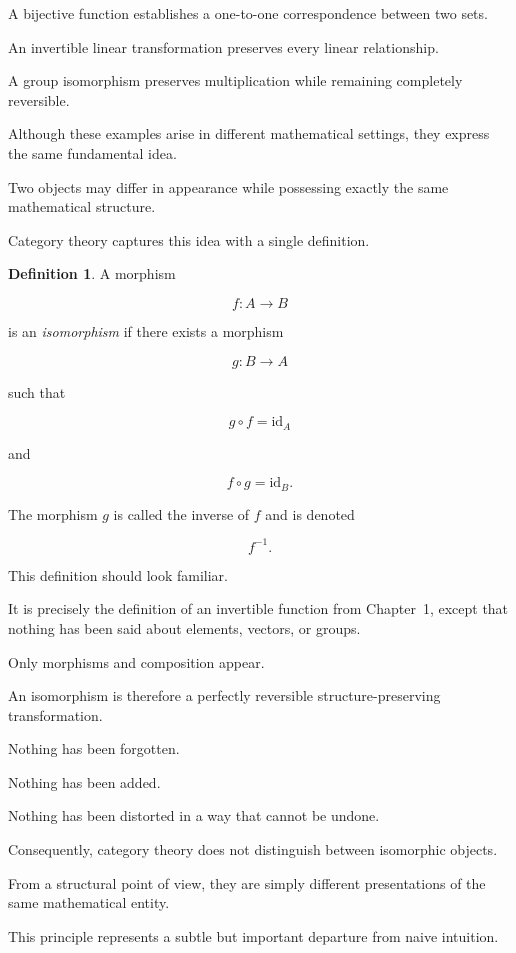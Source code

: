 \documentclass[11pt]{book}
\numberwithin{equation}{chapter}
\theoremstyle{definition}
\newtheorem{definition}{Definition}[chapter]
\theoremstyle{plain}
\theoremstyle{remark}
\begin{document}
A bijective function establishes a one-to-one correspondence between two sets.

An invertible linear transformation preserves every linear relationship.

A group isomorphism preserves multiplication while remaining completely reversible.

Although these examples arise in different mathematical settings, they express the same fundamental idea.

Two objects may differ in appearance while possessing exactly the same mathematical structure.

Category theory captures this idea with a single definition.

\begin{definition}
A morphism

\[
f:A\rightarrow B
\]

is an \emph{isomorphism} if there exists a morphism

\[
g:B\rightarrow A
\]

such that

\[
g\circ f=\mathrm{id}_A
\]

and

\[
f\circ g=\mathrm{id}_B.
\]

The morphism \(g\) is called the inverse of \(f\) and is denoted

\[
f^{-1}.
\]
\end{definition}

This definition should look familiar.

It is precisely the definition of an invertible function from Chapter~1, except that nothing has been said about elements, vectors, or groups.

Only morphisms and composition appear.

An isomorphism is therefore a perfectly reversible structure-preserving transformation.

Nothing has been forgotten.

Nothing has been added.

Nothing has been distorted in a way that cannot be undone.

Consequently, category theory does not distinguish between isomorphic objects.

From a structural point of view, they are simply different presentations of the same mathematical entity.

This principle represents a subtle but important departure from naive intuition.
\end{document}
